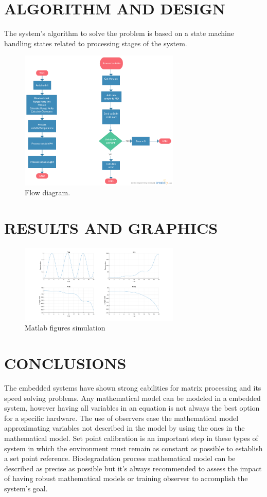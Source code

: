 \documentclass[journal]{IEEEtran}  %
\begin{document}
\section{ALGORITHM AND DESIGN}
The system's algorithm to solve the problem is based on a state machine handling states related to processing stages of the system. 

\begin{figure}
	\centering
	\captionsetup{justification=centering}
	\includegraphics[width=3in]{flowchart.png}
	\caption{Flow diagram.}
	\label{fig:figure4}
\end{figure}

\section{RESULTS AND GRAPHICS}
\begin{figure}
	\centering
	\captionsetup{justification=centering}
	\includegraphics[width=3in]{matlab.png}
	\caption{Matlab figures simulation}
	\label{fig:figure5}
\end{figure}


\section{CONCLUSIONS}
The embedded systems \cite{IEEEexample:article_typical} have shown strong cabilities for matrix processing and its speed solving problems. Any mathematical model can be modeled in a embedded system, however having all variables in an equation is not always the best option for a specific hardware. The use of observers ease the mathematical model approximating variables not described in the model by using the ones in the mathematical model. Set point calibration is an important step in these types of system in which the environment must remain as constant as possible to establish a set point reference. Biodegradation process mathematical model can be described as precise as possible but it's always recommended to assess the impact of having robust mathematical models or training observer to accomplish the system's goal.
\end{document}
